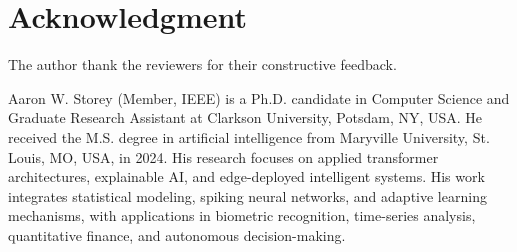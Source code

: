 \documentclass[10pt,journal,compsoc]{IEEEtran}
\begin{document}
\section*{Acknowledgment}
The author thank the reviewers for their constructive feedback.




\begin{IEEEbiography}{Aaron W. Storey}
(Member, IEEE) is a Ph.D. candidate in Computer Science and Graduate Research Assistant at Clarkson University, Potsdam, NY, USA. He received the M.S. degree in artificial intelligence from Maryville University, St. Louis, MO, USA, in 2024. His research focuses on applied transformer architectures, explainable AI, and edge-deployed intelligent systems. His work integrates statistical modeling, spiking neural networks, and adaptive learning mechanisms, with applications in biometric recognition, time-series analysis, quantitative finance, and autonomous decision-making.
\end{IEEEbiography}
\end{document}

